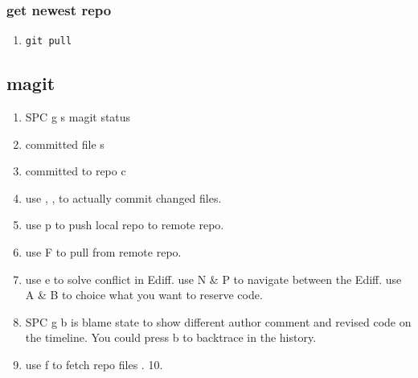 \documentclass[11pt]{article}
\begin{document}
\subsubsection{get newest repo}
\label{sec:orgb4939b3}
\begin{enumerate}
\item \texttt{git pull}
\end{enumerate}

\subsection{magit}
\label{sec:orge6d9399}
\begin{enumerate}
\item SPC g s  magit status
\item committed file  s
\item committed to repo  c
\item use  , ,   to actually commit changed files.
\item use  p  to push local repo to remote repo.
\item use  F  to pull from remote repo.
\item use  e  to solve conflict in Ediff. 
use  N \& P  to navigate between the Ediff.
use  A \& B  to choice what you want to reserve code.
\item SPC g b  is blame state to show different
author comment and revised code on the timeline. You could press
 b  to backtrace in the history.
\item use  f  to fetch repo files \cite{remy2000using} .
10.\cite{kosba2016hawk}
\end{enumerate}


\printbibliography[title=参考文献]
\end{document}
